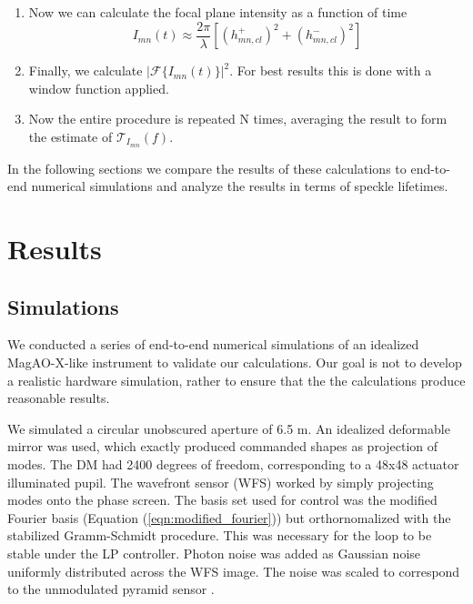 \documentclass[10pt,preprint]{aastex631}
\begin{document}
\begin{enumerate}
\item Now we can calculate the focal plane intensity as a function of time
\begin{equation}
I_{mn}(t) \approx \frac{2\pi}{\lambda}\left[ \left(h_{mn,cl}^+\right)^2 + \left(h_{mn,cl}^-\right)^2 \right] 
\end{equation}
\item Finally, we calculate $|\mathcal{F}\{I_{mn}(t)\}|^2$.  For best results this is done with a window function applied.
\item Now the entire procedure is repeated N times, averaging the result to form the estimate of $\mathcal{T}_{I_{mn}}(f)$.
\end{enumerate}

In the following sections we compare the results of these calculations to end-to-end numerical simulations and analyze the results in terms of speckle lifetimes.

\afterpage{\clearpage}



\section{Results}



\subsection{Simulations}

We conducted a series of end-to-end numerical simulations of an idealized MagAO-X-like instrument to validate our calculations.  Our goal is not to develop a realistic hardware simulation, rather to ensure that the the calculations produce reasonable results. 

We simulated a circular unobscured aperture of 6.5 m.   An idealized deformable mirror was used, which exactly produced commanded shapes as projection of modes.  The DM had 2400 degrees of freedom, corresponding to a 48x48 actuator illuminated pupil.  The wavefront sensor (WFS) worked by simply projecting modes onto the phase screen.  The basis set used for control was the modified Fourier basis (Equation (\ref{eqn:modified_fourier})) but orthornomalized with the stabilized Gramm-Schmidt procedure.  This was necessary for the loop to be stable under the LP controller.  Photon noise was added as Gaussian noise uniformly distributed across the WFS image.  The noise was scaled to correspond to the unmodulated pyramid sensor  \cite[$\beta_p = \sqrt{2}$,][]{2005ApJ...629..592G}.
\end{document}
